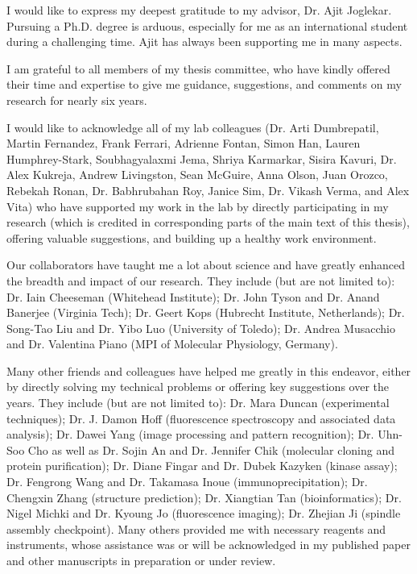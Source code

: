 I would like to express my deepest gratitude to my advisor, Dr. Ajit Joglekar. Pursuing a Ph.D. degree is arduous, especially for me as an international student during a challenging time. Ajit has always been supporting me in many aspects. %

I am grateful to all members of my thesis committee, who have kindly offered their time and expertise to give me guidance, suggestions, and comments on my research for nearly six years.

I would like to acknowledge all of my lab colleagues (Dr. Arti Dumbrepatil, Martin Fernandez, Frank Ferrari, Adrienne Fontan, Simon Han, Lauren Humphrey-Stark, Soubhagyalaxmi Jema, Shriya Karmarkar, Sisira Kavuri, Dr. Alex Kukreja, Andrew Livingston, Sean McGuire, Anna Olson, Juan Orozco, Rebekah Ronan, Dr. Babhrubahan Roy, Janice Sim, Dr. Vikash Verma, and Alex Vita) who have supported my work in the lab by directly participating in my research (which is credited in corresponding parts of the main text of this thesis), offering valuable suggestions, and building up a healthy work environment.

Our collaborators have taught me a lot about science and have greatly enhanced the breadth and impact of our research. They include (but are not limited to): Dr. Iain Cheeseman (Whitehead Institute); Dr. John Tyson and Dr. Anand Banerjee (Virginia Tech); Dr. Geert Kops (Hubrecht Institute, Netherlands); Dr. Song-Tao Liu and Dr. Yibo Luo (University of Toledo); Dr. Andrea Musacchio and Dr. Valentina Piano (MPI of Molecular Physiology, Germany).

Many other friends and colleagues have helped me greatly in this endeavor, either by directly solving my technical problems or offering key suggestions over the years. They include (but are not limited to): Dr. Mara Duncan (experimental techniques); Dr. J. Damon Hoff (fluorescence spectroscopy and associated data analysis); Dr. Dawei Yang (image processing and pattern recognition); Dr. Uhn-Soo Cho as well as Dr. Sojin An and Dr. Jennifer Chik (molecular cloning and protein purification); Dr. Diane Fingar and Dr. Dubek Kazyken (kinase assay); Dr. Fengrong Wang and Dr. Takamasa Inoue (immunoprecipitation); Dr. Chengxin Zhang (structure prediction); Dr. Xiangtian Tan (bioinformatics); Dr. Nigel Michki and Dr. Kyoung Jo (fluorescence imaging); Dr. Zhejian Ji (spindle assembly checkpoint). Many others provided me with necessary reagents and instruments, whose assistance was or will be acknowledged in my published paper \cite{eSAC} and other manuscripts in preparation or under review.

